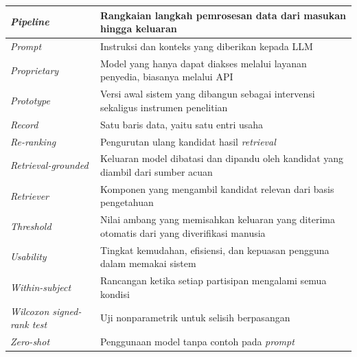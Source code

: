 {\begin{longtable}{|L{0.27\textwidth}|L{0.62\textwidth}|}
\textit{Pipeline} & Rangkaian langkah pemrosesan data dari masukan hingga keluaran \\ \hline
\textit{Prompt} & Instruksi dan konteks yang diberikan kepada LLM \\ \hline
\textit{Proprietary} & Model yang hanya dapat diakses melalui layanan penyedia, biasanya melalui API \\ \hline
\textit{Prototype} & Versi awal sistem yang dibangun sebagai intervensi sekaligus instrumen penelitian \\ \hline
\textit{Record} & Satu baris data, yaitu satu entri usaha \\ \hline
\textit{Re-ranking} & Pengurutan ulang kandidat hasil \textit{retrieval} \\ \hline
\textit{Retrieval-grounded} & Keluaran model dibatasi dan dipandu oleh kandidat yang diambil dari sumber acuan \\ \hline
\textit{Retriever} & Komponen yang mengambil kandidat relevan dari basis pengetahuan \\ \hline
\textit{Threshold} & Nilai ambang yang memisahkan keluaran yang diterima otomatis dari yang diverifikasi manusia \\ \hline
\textit{Usability} & Tingkat kemudahan, efisiensi, dan kepuasan pengguna dalam memakai sistem \\ \hline
\textit{Within-subject} & Rancangan ketika setiap partisipan mengalami semua kondisi \\ \hline
\textit{Wilcoxon signed-rank test} & Uji nonparametrik untuk selisih berpasangan \\ \hline
\textit{Zero-shot} & Penggunaan model tanpa contoh pada \textit{prompt} \\ \hline
\end{longtable}
}

\clearpage
